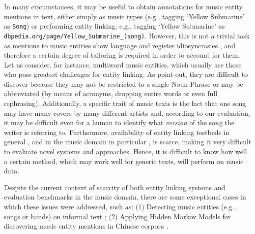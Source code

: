 In many circumstances, it may be useful to obtain annotations for music entity mentions in text, either simply as music types (e.g., tagging `Yellow Submarine' as \texttt{Song}) or performing entity linking, e.g., tagging `Yellow Submarine' as \texttt{dbpedia.org/page/Yellow\_Submarine\_(song)}. However, this is not a trivial task as mentions to music entities show language and register idiosyncrasies \citep{Tata2010,Gruhl2009}, and therefore a certain degree of tailoring is required in order to account for them. Let us consider, for instance, multiword music entities, which usually are those who pose greatest challenges for entity linking. As \cite{Tata2010} point out, they are difficult to discover because they may not be restricted to a single Noun Phrase or may be abbreviated (by means of acronyms, dropping entire words or even full rephrasing). Additionally, a specific trait of music texts is the fact that one song may have many covers by many different artists and, according to our evaluation, it may be difficult even for a human to identify what \textit{version} of the song the writer is referring to. Furthermore, availability of entity linking testbeds in general \citep{Usbeck2015}, and in the music domain in particular \citep{Gruhl2009}, is scarce, making it very difficult to evaluate novel systems and approaches. Hence, it is difficult to know how well a certain method, which may work well for generic texts, will perform on music data.


Despite the current context of scarcity of both entity linking systems and evaluation benchmarks in the music domain, there are some exceptional cases in which these issues were addressed, such as: (1) Detecting music entities (e.g., songs or bands) on informal text \citep{Gruhl2009}; (2) Applying Hidden Markov Models for discovering music entity mentions in Chinese corpora \citep{Zhang2009}.%

